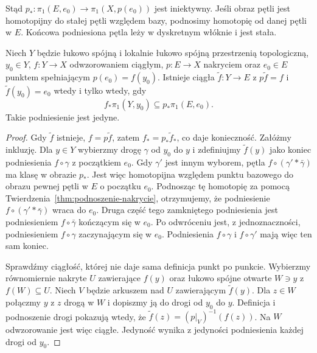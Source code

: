 Stąd $p_*:\pi_1(E,e_0)\to\pi_1(X,p(e_0))$
jest iniektywny. Jeśli obraz pętli jest
homotopijny do stałej pętli względem bazy,
podnosimy homotopię od danej pętli w $E$.
Końcowa podniesiona pętla leży w dyskretnym
włóknie i jest stała.

\begin{twierdzenie}
\label{thm:kryterium-podnoszenia}
Niech $Y$ będzie łukowo spójną i lokalnie
łukowo spójną przestrzenią topologiczną,
$y_0\in Y$, $f:Y\to X$ odwzorowaniem ciągłym,
$p:E\to X$ nakryciem oraz $e_0\in E$
punktem spełniającym $p(e_0)=f(y_0)$.
Istnieje ciągła $\widetilde f:Y\to E$
z $p\widetilde f=f$ i
$\widetilde f(y_0)=e_0$ wtedy i tylko wtedy, gdy
\[
 f_*\pi_1(Y,y_0)\subseteq
 p_*\pi_1(E,e_0).
\]
Takie podniesienie jest jedyne.
\end{twierdzenie}
\begin{proof}
Gdy $\widetilde f$ istnieje,
$f=p\widetilde f$, zatem
$f_*=p_*\widetilde f_*$, co daje konieczność.
Załóżmy inkluzję. Dla $y\in Y$ wybierzmy
drogę $\gamma$ od $y_0$ do $y$ i
zdefiniujmy $\widetilde f(y)$ jako koniec
podniesienia $f\circ\gamma$ z początkiem $e_0$.
Gdy $\gamma'$ jest innym wyborem,
pętla $f\circ(\gamma'*\bar\gamma)$
ma klasę w obrazie $p_*$. Jest więc
homotopijna względem punktu bazowego
do obrazu pewnej pętli w $E$ o początku
$e_0$. Podnosząc tę homotopię za pomocą
Twierdzenia~\ref{thm:podnoszenie-nakrycie},
otrzymujemy, że podniesienie
$f\circ(\gamma'*\bar\gamma)$ wraca do $e_0$.
Druga część tego zamkniętego podniesienia jest podniesieniem
$f\circ\bar\gamma$ kończącym się w $e_0$.
Po odwróceniu jest, z jednoznaczności, podniesieniem
$f\circ\gamma$ zaczynającym się w $e_0$.
Podniesienia $f\circ\gamma$ i $f\circ\gamma'$ mają więc ten sam koniec.

Sprawdźmy ciągłość, której nie daje sama
definicja punkt po punkcie. Wybierzmy
równomiernie nakryte $U$ zawierające $f(y)$
oraz łukowo spójne otwarte $W\ni y$ z
$f(W)\subseteq U$. Niech $V$ będzie
arkuszem nad $U$ zawierającym $\widetilde f(y)$.
Dla $z\in W$ połączmy $y$ z $z$ drogą
w $W$ i dopiszmy ją do drogi od $y_0$
do $y$. Definicja i podnoszenie drogi
pokazują wtedy, że
$\widetilde f(z)=(p|_V)^{-1}(f(z))$.
Na $W$ odwzorowanie jest więc ciągłe.
Jedyność wynika z jedyności podniesienia
każdej drogi od $y_0$.
\end{proof}

